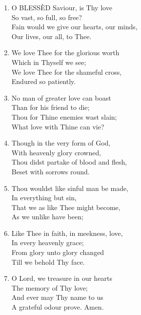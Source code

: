 \documentclass[11pt,a4paper]{article}
\begin{document}
\begin{enumerate}
    \item O BLESS\`ED Saviour, is Thy love \\
            So vast, so full, so free? \\
        Fain would we give our hearts, our minds, \\
            Our lives, our all, to Thee.

    \item We love Thee for the glorious worth \\
            Which in Thyself we see; \\
        We love Thee for the shameful cross, \\
            Endured so patiently.

    \item No man of greater love can boast \\
            Than for his friend to die; \\
        Thou for Thine enemies wast slain; \\
            What love with Thine can vie?

    \item Though in the very form of God, \\
            With heavenly glory crowned, \\
        Thou didst partake of blood and flesh, \\
            Beset with sorrows round.

    \item Thou wouldst like sinful man be made, \\
            In everything but sin, \\
        That we as like Thee might become, \\
            As we unlike have been;

    \item Like Thee in faith, in meekness, love, \\
            In every heavenly grace; \\
        From glory unto glory changed \\
            Till we behold Thy face.

    \item O Lord, we treasure in our hearts \\
            The memory of Thy love; \\
        And ever may Thy name to us \\
            A grateful odour prove. Amen.

\end{enumerate}
\end{document}
